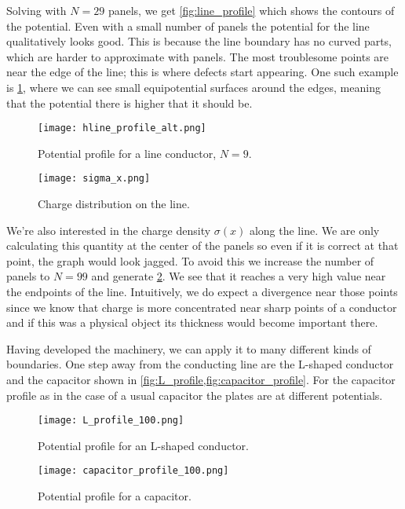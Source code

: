 \documentclass[10pt,a4paper,twocolumn]{article}
\begin{document}
Solving with $N=29$ panels, we get \cref{fig:line_profile} which shows the contours of the potential. Even with a small number of panels the potential for the line qualitatively looks good. This is because the line boundary has no curved parts, which are harder to approximate with panels. The most troublesome points are near the edge of the line; this is where defects start appearing. One such example is \cref{fig:line_profile_alt}, where we can see small equipotential surfaces around the edges, meaning that the potential there is higher that it should be.

\begin{figure}[!t]
    \centering
    \texttt{[image: hline\_profile\_alt.png]}
    \caption{Potential profile for a line conductor, $N=9$.}
    \label{fig:line_profile_alt}
\end{figure}

\begin{figure}[!b]
    \centering
    \texttt{[image: sigma\_x.png]}
    \caption{Charge distribution on the line.}
    \label{fig:sigma_x}
\end{figure}

We're also interested in the charge density $\sigma(x)$ along the line. We are only calculating this quantity at the center of the panels so even if it is correct at that point, the graph would look jagged. To avoid this we increase the number of panels to $N=99$ and generate \cref{fig:sigma_x}. We see that it reaches a very high value near the endpoints of the line. Intuitively, we do expect a divergence near those points since we know that charge is more concentrated near sharp points of a conductor and if this was a physical object its thickness would become important there.

Having developed the machinery, we can apply it to many different kinds of boundaries. One step away from the conducting line are the L-shaped conductor and the capacitor shown in \cref{fig:L_profile,fig:capacitor_profile}. For the capacitor profile as in the case of a usual capacitor the plates are at different potentials.

\begin{figure}[!h]
    \centering
    \texttt{[image: L\_profile\_100.png]}
    \caption{Potential profile for an L-shaped conductor.}
    \label{fig:L_profile}
\end{figure}

\begin{figure}[!h]
    \centering
    \texttt{[image: capacitor\_profile\_100.png]}
    \caption{Potential profile for a capacitor.}
    \label{fig:capacitor_profile}
\end{figure}
\end{document}
